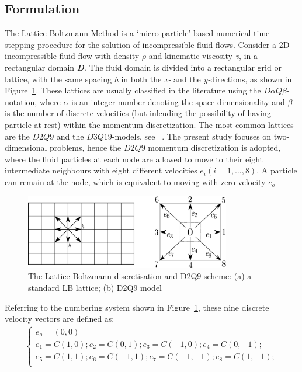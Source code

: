 \subsection{Formulation}
The Lattice Boltzmann Method is a `micro-particle' based numerical time-stepping procedure for the solution of incompressible fluid flows. Consider a 2D incompressible fluid flow with density $\rho$ and kinematic viscosity \textit{v}, in a rectangular domain \textit{\textbf{D}}. The fluid domain is divided into a rectangular grid or lattice, with the same spacing \textit{h} in both the \textit{x-} and the \textit{y-}directions, as shown in Figure~\ref{fig:D2Q9}. These lattices are usually classified in the literature using the $\textit{D}\alpha\textit{Q}\beta$-notation, where $\alpha$ is an integer number denoting the space dimensionality and $\beta$ is the number of discrete velocities (but inlcuding the possibility of having particle at rest) within the momentum discretization. The most common lattices are the $\textit{D2Q9}$ and the $\textit{D3Q19}$-models, see ~\citet{he1997}. The present study focuses on two-dimensional problems, hence the $\textit{D2Q9}$ momentum discretization is adopted, where the fluid particles at each node are allowed to move to their eight intermediate neighbours with eight different velocities $\textit{e}_{\textit{i}} (\textit{i}=1,\dots,8)$. A particle can remain at the node, which is equivalent to moving with zero velocity $\textit{e}_{\textit{o}}$
\begin{figure}[h]
\centering
\includegraphics[width=0.8\textwidth]{Chapter3/figures/lbm/D2Q9.png}
\caption[The Lattice Boltzmann discretisation and D2Q9 scheme]{The Lattice Boltzmann discretisation and D2Q9 scheme: (a) a standard LB lattice; (b) D2Q9 model~\citep{han2007}}
\label{fig:D2Q9}
\end{figure}
Referring to the numbering system shown in Figure~\ref{fig:D2Q9}, these nine discrete velocity vectors are defined as:
\begin{align} 
\begin{cases}
\textit{e}_{\textit{o}}=(0,0)\\
\textit{e}_{\textit{1}}=\textit{C}(1,0); \textit{e}_{\textit{2}}=\textit{C}(0,1); \textit{e}_{\textit{3}}=\textit{C}(-1,0); \textit{e}_{\textit{4}}=\textit{C}(0,-1); \\
\textit{e}_{\textit{5}}=\textit{C}(1,1); \textit{e}_{\textit{6}}=\textit{C}(-1,1); \textit{e}_{\textit{7}}=\textit{C}(-1,-1); \textit{e}_{\textit{8}}=\textit{C}(1,-1); \\ 
\end{cases}
\end{align}
